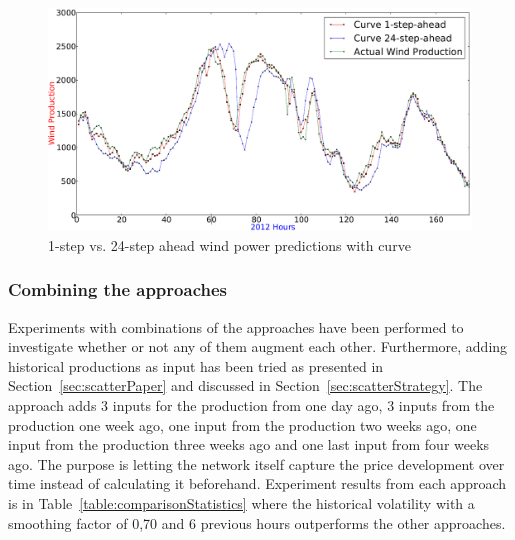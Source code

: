 \begin{figure}[H]
\centering
\includegraphics[width=0.99\linewidth]{billeder/curveOneAheadvs24Ahead.png}
\caption{1-step vs. 24-step ahead wind power predictions with curve}
\label{fig:curveOneAheadvs24Ahead}
\end{figure}   

\subsubsection{Combining the approaches}
\label{sec:combiningTheApproachesWP}
Experiments with combinations of the approaches have been performed to investigate whether or not any of them augment each other. Furthermore, adding historical productions as input has been tried as presented in Section~\ref{sec:scatterPaper} and discussed in Section~\ref{sec:scatterStrategy}. The approach adds 3 inputs for the production from one day ago, 3 inputs from the production one week ago, one input from the production two weeks ago, one input from the production three weeks ago and one last input from four weeks ago. The purpose is letting the network itself capture the price development over time instead of calculating it beforehand. Experiment results from each approach is in Table~\ref{table:comparisonStatistics} where the historical volatility with a smoothing factor of 0,70 and 6 previous hours outperforms the other approaches. 

